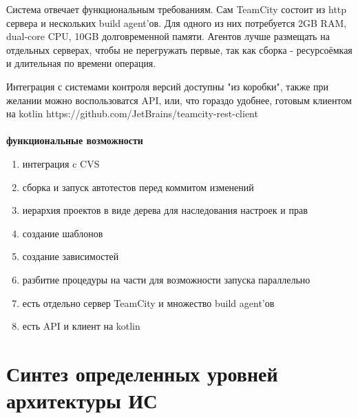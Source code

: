 \documentclass{article}
\begin{document}

Система отвечает функциональным требованиям.
Сам TeamCity состоит из http сервера и нескольких build agent'ов.
Для одного из них потребуется 2GB RAM, dual-core CPU, 10GB долговременной памяти.
Агентов лучше размещать на отдельных серверах, чтобы не перегружать первые, так как сборка - ресурсоёмкая и длительная по времени операция.

Интеграция с системами контроля версий доступны "из коробки", также при желании можно воспользоватся API, или, что гораздо удобнее,
готовым клиентом на kotlin https://github.com/JetBrains/teamcity-rest-client
\\\\
\textbf{функциональные возможности}
\begin{enumerate}
    \item{интеграция c CVS}
    \item{сборка и запуск автотестов перед коммитом изменений}
    \item{иерархия проектов в виде дерева для наследования настроек и прав}
    \item{создание шаблонов}
    \item{создание зависимостей}
    \item{разбитие процедуры на части для возможности запуска  параллельно}
    \item{есть отдельно сервер TeamCity и множество build agent'ов}
    \item{есть API и клиент на kotlin}
\end{enumerate}
\pagebreak

\section{Синтез определенных уровней архитектуры ИС}
\end{document}
